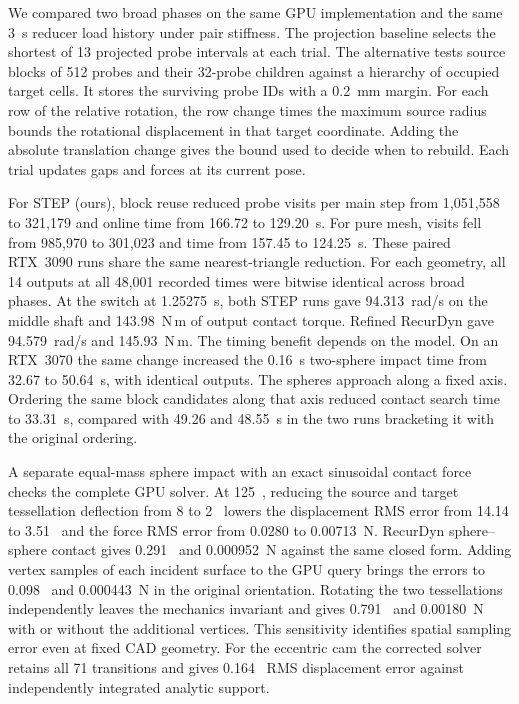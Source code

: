 We compared two broad phases on the same GPU implementation and the same 3~s reducer load history under pair stiffness. The projection baseline selects the shortest of 13 projected probe intervals at each trial. The alternative tests source blocks of 512 probes and their 32-probe children against a hierarchy of occupied target cells. It stores the surviving probe IDs with a 0.2~mm margin. For each row of the relative rotation, the row change times the maximum source radius bounds the rotational displacement in that target coordinate. Adding the absolute translation change gives the bound used to decide when to rebuild. Each trial updates gaps and forces at its current pose.

For STEP (ours), block reuse reduced probe visits per main step from 1,051,558 to 321,179 and online time from 166.72 to 129.20~s. For pure mesh, visits fell from 985,970 to 301,023 and time from 157.45 to 124.25~s. These paired RTX~3090 runs share the same nearest-triangle reduction. For each geometry, all 14 outputs at all 48,001 recorded times were bitwise identical across broad phases. At the switch at 1.25275~s, both STEP runs gave 94.313~rad/s on the middle shaft and 143.98~N\,m of output contact torque. Refined RecurDyn gave 94.579~rad/s and 145.93~N\,m. The timing benefit depends on the model. On an RTX~3070 the same change increased the 0.16~s two-sphere impact time from 32.67 to 50.64~s, with identical outputs.
The spheres approach along a fixed axis. Ordering the same block candidates along that axis reduced contact search time to 33.31~s, compared with 49.26 and 48.55~s in the two runs bracketing it with the original ordering.

A separate equal-mass sphere impact with an exact sinusoidal contact force checks the complete GPU solver. At 125~\microsec{}, reducing the source and target tessellation deflection from 8 to 2~\micron{} lowers the displacement RMS error from 14.14 to 3.51~\micron{} and the force RMS error from 0.0280 to 0.00713~N. RecurDyn sphere--sphere contact gives 0.291~\micron{} and 0.000952~N against the same closed form. Adding vertex samples of each incident surface to the GPU query brings the errors to 0.098~\micron{} and 0.000443~N in the original orientation. Rotating the two tessellations independently leaves the mechanics invariant and gives 0.791~\micron{} and 0.00180~N with or without the additional vertices. This sensitivity identifies spatial sampling error even at fixed CAD geometry. For the eccentric cam the corrected solver retains all 71 transitions and gives 0.164~\micron{} RMS displacement error against independently integrated analytic support.
